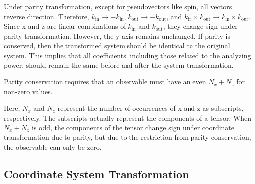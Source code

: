 \documentclass[twocolumn,twoside,showpacs,preprintnumbers,superscriptaddress,amsmath,amssymb,prc]{revtex4}
\begin{document}
Under parity transformation, except for pseudovectors like spin, all vectors reverse direction. Therefore, $k_{\text{in}} \rightarrow -k_{\text{in}}$, $k_{\text{out}} \rightarrow -k_{\text{out}}$, and $k_{\text{in}} \times k_{\text{out}} \rightarrow k_{\text{in}} \times k_{\text{out}}$. Since x and z are linear combinations of $k_{\text{in}}$ and $k_{\text{out}}$, they change sign under parity transformation. However, the y-axis remains unchanged. If parity is conserved, then the transformed system should be identical to the original system. This implies that all coefficients, including those related to the analyzing power, should remain the same before and after the system transformation.


Parity conservation requires that an observable must have an even $N_x + N_z$ for non-zero values.

Here, $N_x$ and $N_z$ represent the number of occurrences of x and z as subscripts, respectively. The subscripts actually represent the components of a tensor. When $N_x + N_z$ is odd, the components of the tensor change sign under coordinate transformation due to parity, but due to the restriction from parity conservation, the observable can only be zero.


\subsection{Coordinate System Transformation}
\end{document}
